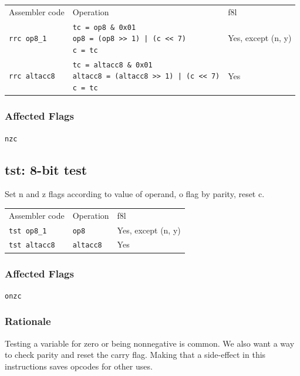 \documentclass{book}
\begin{document}
\begin{tabular}{l l l}
Assembler code       & Operation                                                                                               & f8l \\
\texttt{rrc op8\_1}  & \makecell{\texttt{tc = op8  \& 0x01}\\\texttt{op8 = (op8 >> 1) | (c << 7)}\\\texttt{c = tc}}            & Yes, except (n, y) \\
\texttt{rrc altacc8} & \makecell{\texttt{tc = altacc8 \& 0x01}\\\texttt{altacc8 = (altacc8 >> 1) | (c << 7)}\\\texttt{c = tc}} & Yes
\end{tabular}

\subsubsection*{Affected Flags}

\texttt{nzc}


\subsection{tst: 8-bit test}

Set n and z flags according to value of operand, o flag by parity, reset c.

\begin{tabular}{l l l}
Assembler code       & Operation        & f8l \\
\texttt{tst op8\_1}  & \texttt{op8}     & Yes, except (n, y) \\
\texttt{tst altacc8} & \texttt{altacc8} & Yes
\end{tabular}

\subsubsection*{Affected Flags}

\texttt{onzc}

\subsubsection*{Rationale}

Testing a variable for zero or being nonnegative is common. We also want a way to check parity and reset the carry flag. Making that a side-effect in this instructions saves opcodes for other uses.
\end{document}
